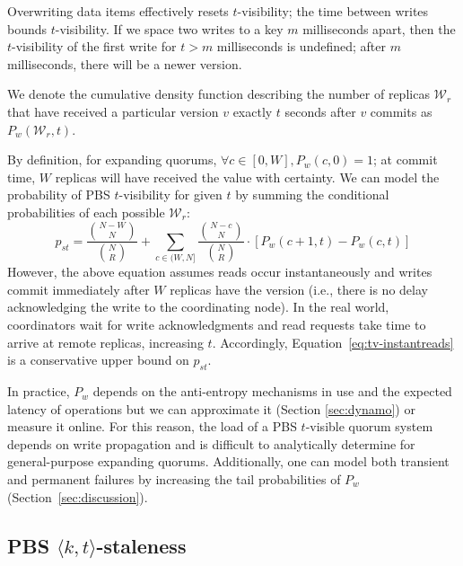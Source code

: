 \documentclass{vldb}
\newcommand{\subsectionskip}{-0em}
\begin{document}
Overwriting data items effectively resets $t$-visibility; the time
between writes bounds $t$-visibility. If we space two writes to a key
$m$ milliseconds apart, then the $t$-visibility of the first write for
$t > m$ milliseconds is undefined; after $m$ milliseconds, there will
be a newer version.

We denote the cumulative density function describing the number of
replicas $\mathcal{W}_r$ that have received a particular version $v$
exactly $t$ seconds after $v$ commits as $P_w(\mathcal{W}_r, t)$.

By definition, for expanding quorums, $\forall c \in [0, W], P_w(c,0)
= 1$; at commit time, $W$ replicas will have received the value with
certainty.  We can model the probability of PBS $t$-visibility for given $t$ by summing the conditional probabilities of each possible
$\mathcal{W}_r$:
\begin{equation}
\label{eq:tv-instantreads}
p_{st} = \frac{{N-W \choose N}}{{N \choose R}}+\sum_{c\in(W, N]} \frac{{N-c \choose N}}{{N \choose R}}\cdot [P_w(c+1, t)-P_w(c,t)]
\end{equation}
However, the above equation assumes reads occur instantaneously and
writes commit immediately after $W$ replicas have the version (i.e.,
there is no delay acknowledging the write to the coordinating node).
In the real world, coordinators wait for write acknowledgments and
read requests take time to arrive at remote replicas, increasing $t$.
Accordingly, Equation~\ref{eq:tv-instantreads} is a conservative upper
bound on $p_{st}$.

In practice, $P_w$ depends on the anti-entropy mechanisms in use and
the expected latency of operations but we can approximate it (Section
\ref{sec:dynamo}) or measure it online.  For this reason, the load of
a PBS $t$-visible quorum system depends on write propagation and is
difficult to analytically determine for general-purpose expanding
quorums.  Additionally, one can model both transient and permanent
failures by increasing the tail probabilities of $P_w$
(Section~\ref{sec:discussion}).

\vspace{2em}


\vspace{\subsectionskip}\subsection{PBS $\langle k, t \rangle$-staleness}
\end{document}

